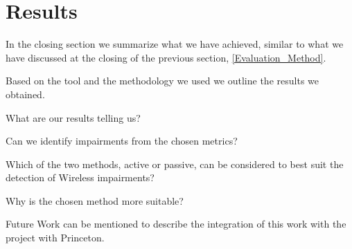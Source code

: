 \section{Results}\label{Results}

In the closing section we summarize what we have achieved, similar to what we have discussed at the closing of the previous section, \ref{Evaluation_Method}.

Based on the tool and the methodology we used we outline the results we obtained.

What are our results telling us?

Can we identify impairments from the chosen metrics?

Which of the two methods, active or passive, can be considered to best suit the detection of Wireless impairments?

Why is the chosen method more suitable?

Future Work can be mentioned to describe the integration of this work with the project with Princeton.
